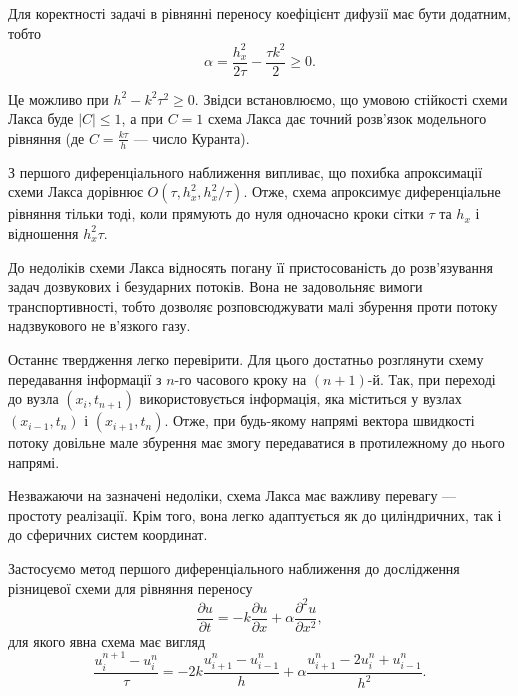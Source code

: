 Для коректності задачі в рівнянні переносу коефіцієнт дифузії має бути додатним, тобто 
\begin{equation}
	\label{eq:l9.4}
    \alpha = \frac{h_x^2}{2\tau}-\frac{\tau k^2}{2}\ge0.
\end{equation}

Це можливо при $h^2-k^2\tau^2\ge0$. Звідси встановлюємо, що умовою стійкості схеми Лакса буде $|C|\le1$, а при $C=1$ схема Лакса дає точний розв'язок модельного рівняння (де $C=\frac{k\tau}{h}$ --- число Куранта). \medskip

З першого диференціального наближення випливає, що похибка апроксимації схеми Лакса дорівнює $O(\tau,h_x^2,h_x^2/\tau)$. Отже, схема апроксимує диференціальне рівняння тільки тоді, коли прямують до нуля одночасно кроки сітки $\tau$ та $h_x$ і відношення $h_x^2\tau$.

\begin{remark}
    До недоліків схеми Лакса відносять погану її пристосованість до роз\-в'я\-зу\-ван\-ня задач дозвукових і безударних потоків. Вона не задовольняє вимоги транспортивності, тобто дозволяє розповсюджувати малі збурення проти потоку надзвукового не в'язкого газу.
\end{remark}

Останнє твердження легко перевірити. Для цього достатньо розглянути схему передавання інформації з $n$-го часового кроку на $(n+1)$-й. Так, при переході до вузла $(x_i,t_{n+1})$ використовується інформація, яка міститься у вузлах $(x_{i-1},t_n)$ і $(x_{i+1},t_n)$. Отже, при будь-якому напрямі вектора швидкості потоку довільне мале збурення має змогу передаватися в протилежному до нього напрямі. \medskip

Незважаючи на зазначені недоліки, схема Лакса має важливу перевагу --- простоту реалізації. Крім того, вона легко адаптується як до циліндричних, так і до сферичних систем координат. \medskip

\begin{example}
    Застосуємо метод першого диференціального наближення до дослідження різницевої схеми для рівняння переносу
    \begin{equation}
        \label{eq:l9.5}
        \frac{\partial u}{\partial t} = -k\frac{\partial u}{\partial x} + \alpha \frac{\partial^2 u}{\partial x^2},
    \end{equation}
    для якого явна схема має вигляд
    \begin{equation*}
        \frac{u_i^{n+1}-u_i^n}{\tau}=-2k\frac{u_{i+1}^n-u_{i-1}^n}{h}+\alpha\frac{u_{i+1}^n-2u_i^n+u_{i-1}^n}{h^2}.
    \end{equation*}
\end{example}

